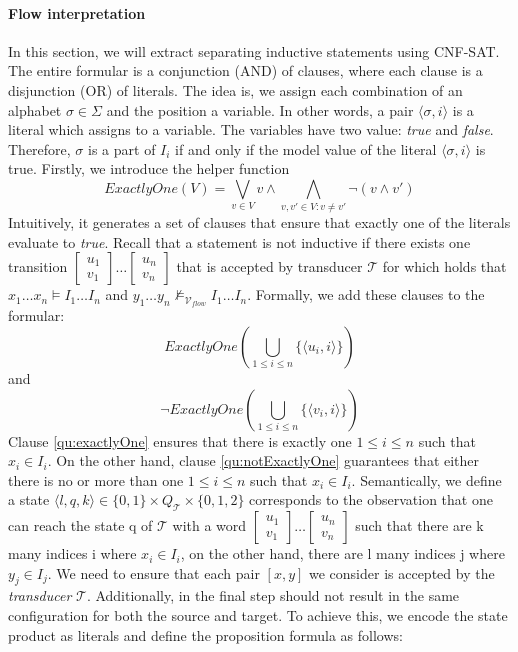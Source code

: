 \paragraph*{Flow interpretation}
In this section, we will extract separating inductive statements using CNF-SAT. 
The entire formular is a conjunction (AND) of clauses, where each clause is a disjunction (OR) of literals.
The idea is, we assign each combination of an alphabet $\sigma \in \Sigma$ and the position 
a variable. 
In other words, a pair $\langle \sigma, i \rangle$ is a literal which assigns to a variable.
The variables have two value: \textit{true} and \textit{false}.
Therefore, $\sigma$ is a part of $I_i$ if and only if the  model value of the literal $\langle \sigma, i \rangle$ is true.
Firstly, we introduce the helper function
\begin{equation*}
    ExactlyOne(V) = \bigvee_{v \in V} v \wedge \bigwedge_{v,v'\in V: v \neq v'} \lnot (v \wedge v')
\end{equation*}
Intuitively, it generates a set of clauses that ensure that exactly one of the 
literals evaluate to \textit{true}.
Recall that a statement is not inductive if there exists one transition
$[\substack{u_1 \\ v_1}] \dots [\substack{u_n \\ v_n}]$ that is accepted by transducer $\mathcal{T}$
for which holds that $x_1 \dots x_n \models I_1 \dots I_n$ and $y_1 \dots y_n \not\models_{\mathcal{V}_{flow}} I_1 \dots I_n$.
Formally, we add these clauses to the formular:
\begin{equation}\label{qu:exactlyOne}
    ExactlyOne(\bigcup_{1 \leq i \leq n} \{ \langle u_i, i \rangle \})
\end{equation}
and 
\begin{equation}\label{qu:notExactlyOne}
    \lnot ExactlyOne(\bigcup_{1 \leq i \leq n} \{ \langle v_i, i \rangle \})
\end{equation}
Clause \ref{qu:exactlyOne} ensures that there is exactly one
$1 \leq i \leq n$ such that $x_i \in I_i$. 
On the other hand, clause \ref{qu:notExactlyOne} guarantees that either there is no 
or more than one $1 \leq i \leq n$ such that $x_i \in I_i$.
Semantically, we define a state $\langle l,q,k \rangle \in \{0,1\} \times Q_{\mathcal{T}} \times \{0,1,2\}$ 
corresponds to the observation that one
can reach the state q of $\mathcal{T}$ with a word $[\substack{u_1 \\ v_1}] \dots [\substack{u_n \\ v_n}]$
such that there are k many indices i where $x_i \in I_i$, on the other hand,
there are l many indices j where $y_j \in I_j$.
We need to ensure that each pair $[x,y]$ we consider is accepted by the \textit{transducer} $\mathcal{T}$.
Additionally, in the final step should not result in the same configuration for both the source and target. 
To achieve this, we encode the state product as literals and define the proposition formula as follows:

